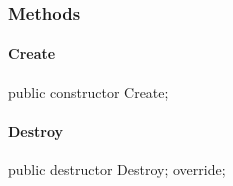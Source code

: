 \documentclass{report}
\newif\ifpdf
\begin{document}
\subsubsection*{\large{\textbf{Methods}}\normalsize\hspace{1ex}\hfill}
\paragraph*{Create}\hspace*{\fill}

\label{ok_nested_2.TCastleProfiler-Create}
\begin{list}{}{
\setlength{\itemindent}{0cm}
\setlength{\listparindent}{0cm}
\setlength{\leftmargin}{\evensidemargin}
\addtolength{\leftmargin}{\tmplength}
\settowidth{\labelsep}{X}
\addtolength{\leftmargin}{\labelsep}
\setlength{\labelwidth}{\tmplength}
}
\item[\textbf{Declaration}\hfill]
\ifpdf
\begin{flushleft}
\fi
\begin{ttfamily}
public constructor Create;\end{ttfamily}

\ifpdf
\end{flushleft}
\fi

\end{list}
\paragraph*{Destroy}\hspace*{\fill}

\label{ok_nested_2.TCastleProfiler-Destroy}
\begin{list}{}{
\setlength{\itemindent}{0cm}
\setlength{\listparindent}{0cm}
\setlength{\leftmargin}{\evensidemargin}
\addtolength{\leftmargin}{\tmplength}
\settowidth{\labelsep}{X}
\addtolength{\leftmargin}{\labelsep}
\setlength{\labelwidth}{\tmplength}
}
\item[\textbf{Declaration}\hfill]
\ifpdf
\begin{flushleft}
\fi
\begin{ttfamily}
public destructor Destroy; override;\end{ttfamily}

\ifpdf
\end{flushleft}
\fi

\end{list}
\end{document}

